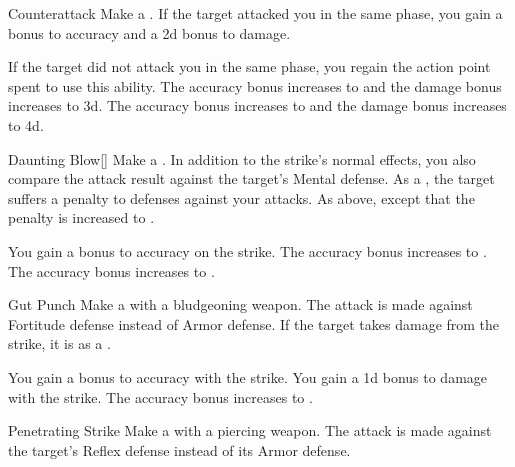 {            \begin{ability}{Counterattack}
                Make a .
                If the target attacked you in the same phase, you gain a  bonus to accuracy and a \plus2d bonus to damage.

                \rankline
                 If the target did not attack you in the same phase, you regain the action point spent to use this ability.
                 The accuracy bonus increases to  and the damage bonus increases to \plus3d.
                 The accuracy bonus increases to  and the damage bonus increases to \plus4d.
            \end{ability}

            \begin{ability}{Daunting Blow}[]
                Make a .
                In addition to the strike's normal effects, you also compare the attack result against the target's Mental defense.
                \hit As a , the target suffers a  penalty to defenses against your attacks.
                \crit As above, except that the penalty is increased to .

                \rankline
                 You gain a  bonus to accuracy on the strike.
                 The accuracy bonus increases to .
                 The accuracy bonus increases to .
            \end{ability}

            \begin{ability}{Gut Punch}
                Make a  with a bludgeoning weapon.
                The attack is made against Fortitude defense instead of Armor defense.
                If the target takes damage from the strike, it is \sickened as a .

                \rankline
                 You gain a  bonus to accuracy with the strike.
                 You gain a \plus1d bonus to damage with the strike.
                 The accuracy bonus increases to .
            \end{ability}

            \begin{ability}{Penetrating Strike}
                Make a  with a piercing weapon.
                The attack is made against the target's Reflex defense instead of its Armor defense.


\end{ability}}
